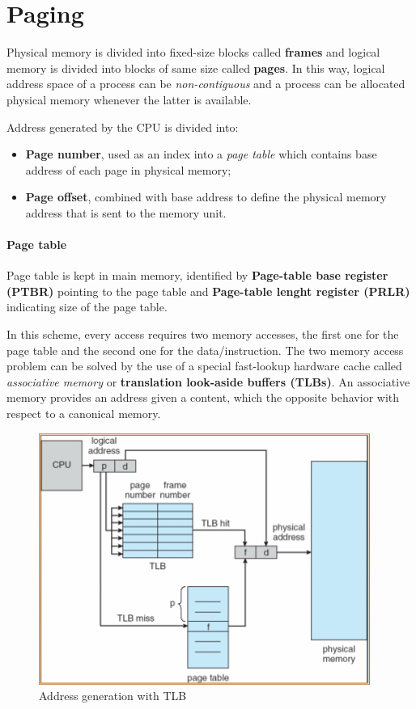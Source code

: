 \section{Paging}
Physical memory is divided into fixed-size blocks called \textbf{frames} and logical memory is divided into blocks of same size called \textbf{pages}. In this way, logical address space of a process can be \emph{non-contiguous} and a process can be allocated physical memory whenever the latter is available.

Address generated by the CPU is divided into:
\begin{itemize}
\item \textbf{Page number}, used as an index into a \emph{page table} which contains base address of each page in physical memory;
\item \textbf{Page offset}, combined with base address to define the physical memory address that is sent to the memory unit.
\end{itemize}

\paragraph{Page table} Page table is kept in main memory, identified by \textbf{Page-table base register (PTBR)} pointing to the page table and \textbf{Page-table lenght register (PRLR)} indicating size of the page table.

In this scheme, every access requires two memory accesses, the first one for the page table and the second one for the data/instruction. The two memory access problem can be solved by the use of a special fast-lookup hardware cache called \emph{associative memory} or \textbf{translation look-aside buffers (TLBs)}. An associative memory provides an address given a content, which the opposite behavior with respect to a canonical memory.

\begin{figure}[hbtp]
\centering
\includegraphics[scale=0.5]{images/memory_management/address_generation_tlb.jpg}
\caption{Address generation with TLB}
\end{figure}

